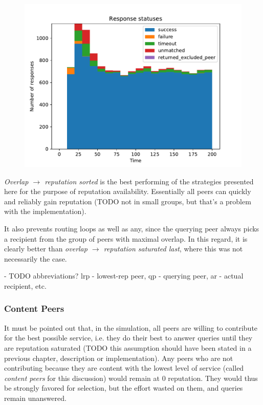 \begin{figure}[t]
\centering
\includegraphics[width=1\columnwidth]{figures/selection_overlap_rep_sorted_resp_statuses}
\label{fig:selection_overlap_rep_sorted_resp_statuses}
\end{figure}

\emph{Overlap $\rightarrow$ reputation sorted} is the best performing of the
strategies presented here for the purpose of reputation availability.
Essentially all peers can quickly and reliably gain reputation (TODO not in
small groups, but that's a problem with the implementation).

It also prevents routing loops as well as any, since the querying peer always
picks a recipient from the group of peers with maximal overlap. In this regard,
it is clearly better than \emph{overlap $\rightarrow$ reputation saturated
last}, where this was not necessarily the case.

- TODO abbreviations? lrp - lowest-rep peer, qp - querying peer, ar - actual
  recipient, etc.

\subsubsection{Content Peers}
\label{sec:rep_avail_selection_rep_sorted_content}
It must be pointed out that, in the simulation, all peers are willing to
contribute for the best possible service, i.e. they do their best to answer
queries until they are reputation saturated (TODO this assumption should have
been stated in a previous chapter, description or implementation). Any peers who
are not contributing because they are content with the lowest level of service
(called \emph{content peers} for this discussion) would remain at 0 reputation.
They would thus be strongly favored for selection, but the effort wasted on
them, and queries remain unanswered.


